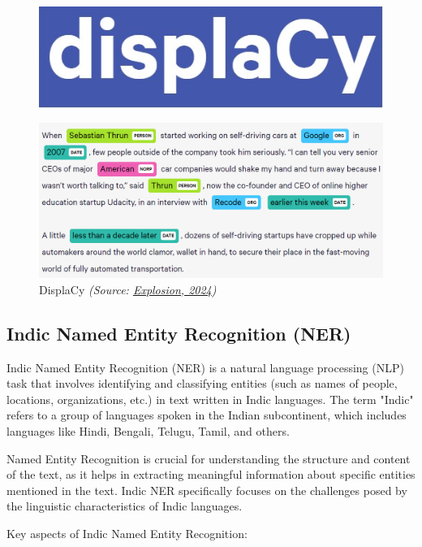 \begin{figure}[H]
\centering
\includegraphics[width=0.4\linewidth]{img/Graphics/displacy2.jpg}

\end{figure}

\begin{figure}[H]
\centering
\includegraphics [scale=0.75 ]{img/Graphics/displacy3.png}
\caption[DisplaCy]{DisplaCy \textit{(Source: \href{https://explosion.ai/about}{Explosion, 2024})}}
\label{fig:DisplaCy.png}

\end{figure}

\subsection{Indic Named Entity Recognition (NER)}

Indic Named Entity Recognition (NER) is a natural language processing (NLP) task that involves identifying and classifying entities (such as names of people, locations, organizations, etc.) in text written in Indic languages. The term "Indic" refers to a group of languages spoken in the Indian subcontinent, which includes languages like Hindi, Bengali, Telugu, Tamil, and others.

Named Entity Recognition is crucial for understanding the structure and content of the text, as it helps in extracting meaningful information about specific entities mentioned in the text. Indic NER specifically focuses on the challenges posed by the linguistic characteristics of Indic languages.

Key aspects of Indic Named Entity Recognition:

